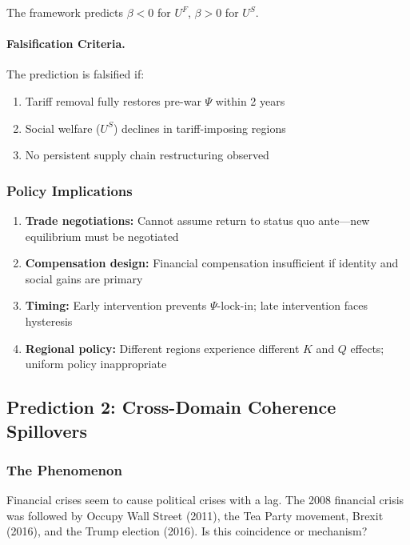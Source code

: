The framework predicts $\beta < 0$ for $U^F$, $\beta > 0$ for $U^S$.

\paragraph{Falsification Criteria.}
The prediction is falsified if:
\begin{enumerate}
  \item Tariff removal fully restores pre-war $\Psi$ within 2 years
  \item Social welfare ($U^S$) declines in tariff-imposing regions
  \item No persistent supply chain restructuring observed
\end{enumerate}

\subsubsection{Policy Implications}

\begin{enumerate}
  \item \textbf{Trade negotiations:} Cannot assume return to status quo ante---new equilibrium must be negotiated
  \item \textbf{Compensation design:} Financial compensation insufficient if identity and social gains are primary
  \item \textbf{Timing:} Early intervention prevents $\Psi$-lock-in; late intervention faces hysteresis
  \item \textbf{Regional policy:} Different regions experience different $K$ and $Q$ effects; uniform policy inappropriate
\end{enumerate}

\subsection{Prediction 2: Cross-Domain Coherence Spillovers}
\label{subsec:pred-spillovers}

\subsubsection{The Phenomenon}

Financial crises seem to cause political crises with a lag. The 2008 financial 
crisis was followed by Occupy Wall Street (2011), the Tea Party movement, 
Brexit (2016), and the Trump election (2016). Is this coincidence or mechanism?


